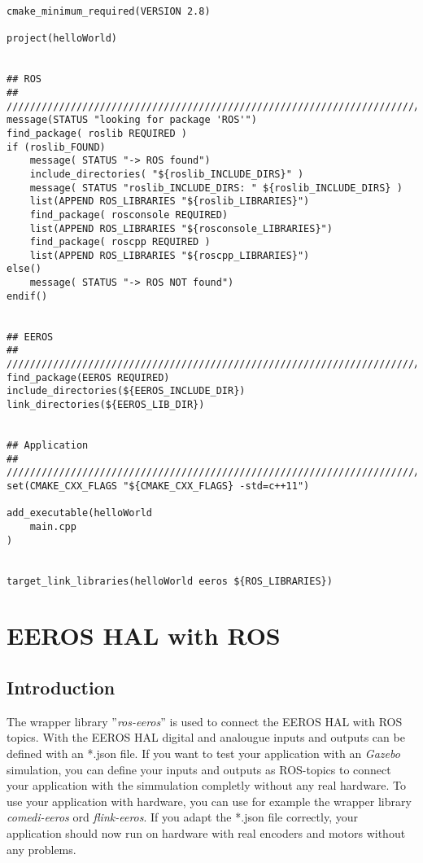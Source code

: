 \lstset{language=c}
\begin{lstlisting}
cmake_minimum_required(VERSION 2.8)
 
project(helloWorld)


## ROS
## ////////////////////////////////////////////////////////////////////////
message(STATUS "looking for package 'ROS'")
find_package( roslib REQUIRED )
if (roslib_FOUND)
	message( STATUS "-> ROS found")
	include_directories( "${roslib_INCLUDE_DIRS}" )
	message( STATUS "roslib_INCLUDE_DIRS: " ${roslib_INCLUDE_DIRS} )
	list(APPEND ROS_LIBRARIES "${roslib_LIBRARIES}")
	find_package( rosconsole REQUIRED)
	list(APPEND ROS_LIBRARIES "${rosconsole_LIBRARIES}")
	find_package( roscpp REQUIRED )
	list(APPEND ROS_LIBRARIES "${roscpp_LIBRARIES}")
else()
	message( STATUS "-> ROS NOT found")
endif()


## EEROS
## ////////////////////////////////////////////////////////////////////////
find_package(EEROS REQUIRED)
include_directories(${EEROS_INCLUDE_DIR})
link_directories(${EEROS_LIB_DIR})


## Application
## ////////////////////////////////////////////////////////////////////////
set(CMAKE_CXX_FLAGS "${CMAKE_CXX_FLAGS} -std=c++11")
 
add_executable(helloWorld
	main.cpp	
)


target_link_libraries(helloWorld eeros ${ROS_LIBRARIES})

\end{lstlisting}


\section{EEROS HAL with ROS}
\subsection{Introduction}
The wrapper library ''\textit{ros-eeros}'' is used to connect the EEROS HAL with ROS topics.
With the EEROS HAL digital and analougue inputs and outputs can be defined with an *.json file.
If you want to test your application with an \textit{Gazebo} simulation, you can define your inputs and outputs as ROS-topics to connect your application with the simmulation completly without any real hardware.
To use your application with hardware, you can use for example the wrapper library \textit{comedi-eeros} ord \textit{flink-eeros}.
If you adapt the *.json file correctly, your application should now run on hardware with real encoders and motors without any problems.

